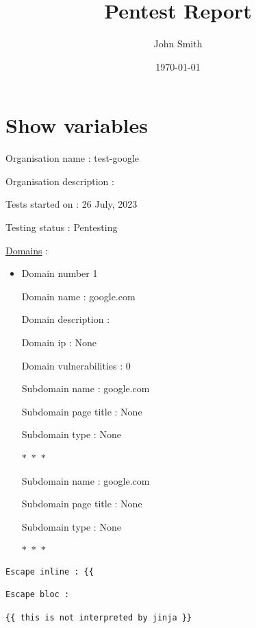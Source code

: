 \documentclass[a4paper,11pt]{book}
\title{Pentest Report} %
\author{John Smith} %
\date{\today} %
\begin{document}
 
\maketitle %

\section{Show variables}

Organisation name : test-google

Organisation description : 

Tests started on : 26 July, 2023\

Testing status : Pentesting

\underline{Domains} :

\begin{itemize}
    \item Domain number 1

    Domain name : google.com

    Domain description : 
    
        Domain ip : None

    Domain vulnerabilities : 0
    


        Subdomain name : google.com

        Subdomain page title : None

        Subdomain type : None

        \begin{center}
            $\ast$~$\ast$~$\ast$
        \end{center}

        Subdomain name : google.com

        Subdomain page title : None

        Subdomain type : None

        \begin{center}
            $\ast$~$\ast$~$\ast$
        \end{center}

    


\end{itemize}


\begin{verbatim} 
Escape inline : {{

Escape bloc : 
 
{{ this is not interpreted by jinja }}

\end{verbatim}
\end{document}
